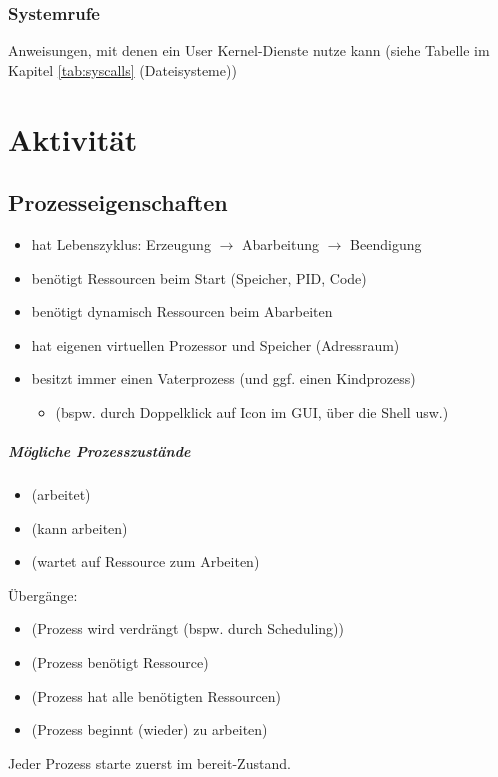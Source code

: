 \subsection{Systemrufe}
Anweisungen, mit denen ein User Kernel-Dienste nutze kann (siehe Tabelle im Kapitel \ref{tab:syscalls} (Dateisysteme))

\chapter{Aktivität}
\section{Prozesseigenschaften}
\begin{itemize}
\item hat Lebenszyklus: Erzeugung $\to$ Abarbeitung $\to $ Beendigung
\item benötigt Ressourcen beim Start (Speicher, PID, Code)
\item benötigt dynamisch Ressourcen beim Abarbeiten
\item hat eigenen virtuellen Prozessor und Speicher (Adressraum)
\item besitzt immer einen Vaterprozess (und ggf. einen Kindprozess)
\begin{itemize}
\item {} (bspw. durch Doppelklick auf Icon im GUI, über die Shell usw.)
\end{itemize}
\end{itemize}
\paragraph{Mögliche Prozesszustände}
\begin{itemize}
\item {} (arbeitet)
\item {} (kann arbeiten)
\item {} (wartet auf Ressource zum Arbeiten)
\end{itemize}
Übergänge:
\begin{itemize}
\item {} (Prozess wird verdrängt (bspw. durch Scheduling))
\item {} (Prozess benötigt Ressource)
\item {} (Prozess hat alle benötigten Ressourcen)
\item {} (Prozess beginnt (wieder) zu arbeiten)
\end{itemize}
Jeder Prozess starte zuerst im bereit-Zustand.
